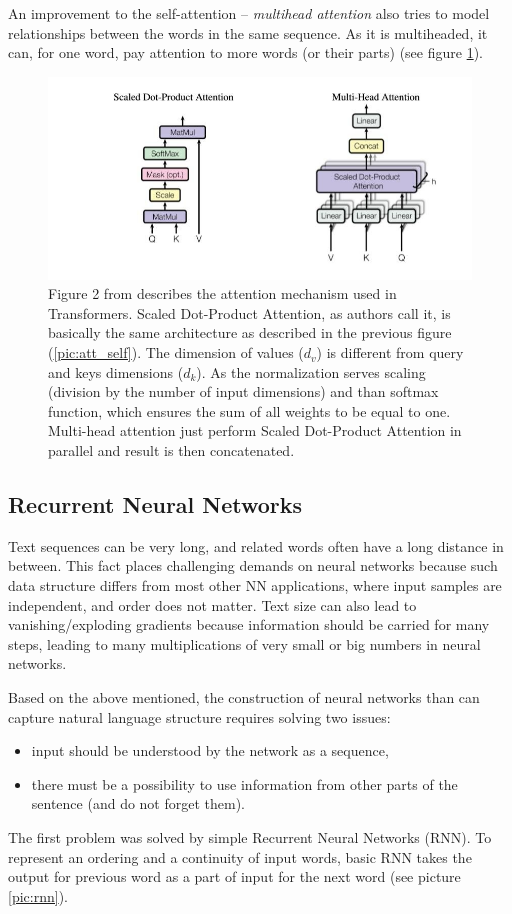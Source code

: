 An improvement to the self-attention -- \textit{multihead attention} \citep{Vaswani2017} also tries to model relationships between the words in the same sequence. As it is multiheaded, it can, for one word, pay attention to more words (or their parts) (see figure \ref{pic:att_multi}).
\begin{figure}[ht]
\centering
\includegraphics[width=1\columnwidth]{../img/attention_multi}
\caption{Figure 2 from \citep{Vaswani2017} describes the attention mechanism used in Transformers. Scaled Dot-Product Attention, as authors call it, is basically the same architecture as described in the previous figure (\ref{pic:att_self}). The dimension of values ($d_v$) is different from query and keys dimensions ($d_k$). As the normalization serves scaling (division by the number of input dimensions) and than softmax function, which ensures the sum of all weights to be equal to one. Multi-head attention just perform Scaled Dot-Product Attention in parallel and result is then concatenated.
}
\label{pic:att_multi}
\end{figure}
\subsection{Recurrent Neural Networks}
\label{sub:RNN}
Text sequences can be very long, and related words often have a long distance in between. This fact places challenging demands on neural networks because such data structure differs from most other NN applications, where input samples are independent, and order does not matter. Text size can also lead to vanishing/exploding gradients because information should be carried for many steps, leading to many multiplications of very small or big numbers in neural networks. %
\par
Based on the above mentioned, the construction of neural networks than can capture natural language structure requires solving two issues:
\begin{itemize}
\item input should be understood by the network as a sequence,
\item there must be a possibility to use information from other parts of the sentence (and do not forget them).
\end{itemize}
The first problem was solved by simple Recurrent Neural Networks (RNN). To represent an ordering and a continuity of input words, basic RNN takes the output for previous word as a part of input for the next word (see picture \ref{pic:rnn}). 
 
